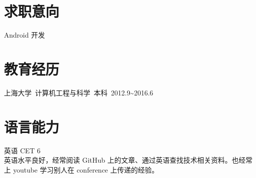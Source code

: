 \documentclass[11pt]{res}
\begin{document}
\address{  beatbox\_gao@hotmail.com\\ GitHub: \url{https://github.com/abcghy} \\ Blog: \url{https://abcghy.github.io/}}
\address{上海杨浦 \\ 17602152878 18818217393}

\begin{resume}

\section{求职意向}
  Android 开发

\section{教育经历}
  上海大学\ 计算机工程与科学\ 本科\ 2012.9\~{}2016.6

\section{语言能力}
  英语 CET 6 \\英语水平良好，经常阅读 GitHub 上的文章、通过英语查找技术相关资料。也经常上 youtube 学习别人在 conference 上传递的经验。


\end{resume}
\end{document}
